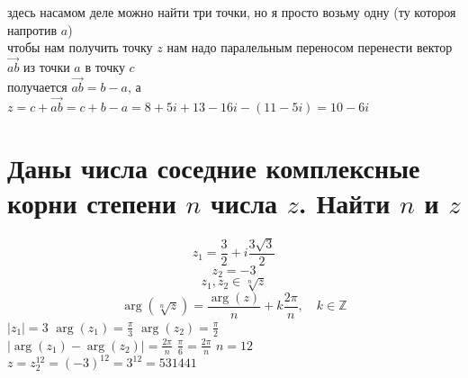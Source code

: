 \documentclass{article}
\renewcommand{\vec}{\overrightarrow}
\newcommand{\ds}{\displaystyle}
\newcommand{\abs}[1]{\left|#1\right|}
\newcommand{\Arg}[1]{\arg\left(#1\right)}
\begin{document}
  \noindent здесь насамом деле можно найти три точки, но я просто возьму одну (ту котороя напротив $a$) \\
  чтобы нам получить точку $z$ нам надо паралельным переносом перенести вектор $\vec{ab}$ из точки $a$ в точку $c$ \\
  получается $\vec{ab} = b - a$, а $z = c + \vec{ab} = c+b-a = 8+5i + 13-16i - (11-5i) = 10-6i$ \\

  \section{Даны числа соседние комплексные корни степени $n$ числа $z$. Найти $n$ и $z$}
  $$ z_1 = \frac{3}{2} + i\frac{3\sqrt{3}}{2} $$
  $$ z_2 = -3 $$
  $$ z_1,z_2 \in \sqrt[n]{z} $$
  $$ \Arg{\sqrt[n]{z}} = \frac{\Arg{z}}{n} + k\frac{2\pi}{n},\quad k\in\mathbb{Z} $$
  $\ds \abs{z_1} = 3$ \quad $\ds \Arg{z_1} = \frac{\pi}{3}$ \quad $\ds \Arg{z_2} = \frac{\pi}{2}$ \\
  $\ds \abs{\Arg{z_1} - \Arg{z_2}} = \frac{2\pi}{n}$ \quad $\ds \frac{\pi}{6} = \frac{2\pi}{n}$ \quad $\ds n = 12$ \\
  $\ds z = z_2^{12} = (-3)^{12} = 3^{12} = 531441$
\end{document}
